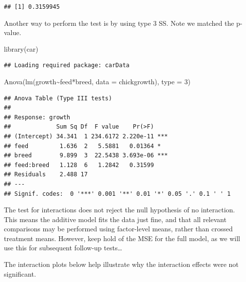 \documentclass[
]{book}
\newenvironment{Shaded}{\begin{snugshade}}{\end{snugshade}}
\newcommand{\AttributeTok}[1]{\textcolor[rgb]{0.77,0.63,0.00}{#1}}
\newcommand{\DecValTok}[1]{\textcolor[rgb]{0.00,0.00,0.81}{#1}}
\newcommand{\FunctionTok}[1]{\textcolor[rgb]{0.00,0.00,0.00}{#1}}
\newcommand{\NormalTok}[1]{#1}
\newcommand{\SpecialCharTok}[1]{\textcolor[rgb]{0.00,0.00,0.00}{#1}}
\begin{document}
\begin{verbatim}
## [1] 0.3159945
\end{verbatim}

Another way to perform the test is by using type 3 SS. Note we matched the p-value.

\begin{Shaded}
\begin{Highlighting}[]
\FunctionTok{library}\NormalTok{(car)}
\end{Highlighting}
\end{Shaded}

\begin{verbatim}
## Loading required package: carData
\end{verbatim}

\begin{Shaded}
\begin{Highlighting}[]
\FunctionTok{Anova}\NormalTok{(}\FunctionTok{lm}\NormalTok{(growth}\SpecialCharTok{\textasciitilde{}}\NormalTok{feed}\SpecialCharTok{*}\NormalTok{breed, }\AttributeTok{data =}\NormalTok{ chickgrowth), }\AttributeTok{type =} \DecValTok{3}\NormalTok{)}
\end{Highlighting}
\end{Shaded}

\begin{verbatim}
## Anova Table (Type III tests)
## 
## Response: growth
##             Sum Sq Df  F value    Pr(>F)    
## (Intercept) 34.341  1 234.6172 2.220e-11 ***
## feed         1.636  2   5.5881   0.01364 *  
## breed        9.899  3  22.5438 3.693e-06 ***
## feed:breed   1.128  6   1.2842   0.31599    
## Residuals    2.488 17                       
## ---
## Signif. codes:  0 '***' 0.001 '**' 0.01 '*' 0.05 '.' 0.1 ' ' 1
\end{verbatim}

The test for interactions does not reject the null hypothesis of no interaction. This means the additive model fits the data just fine, and that all relevant comparisons may be performed using factor-level means, rather than crossed treatment means. However, keep hold of the MSE for the full model, as we will use this for subsequent follow-up tests\ldots{}

The interaction plots below help illustrate why the interaction effects were not significant.
\end{document}

